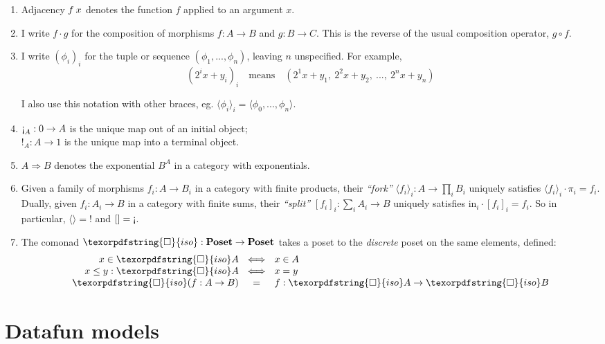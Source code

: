 \documentclass{rntz}\usepackage[a5]{rntzgeometry}\usepackage[fullwidth=130mm,width=330pt,]{narrow}
\newcommand\cat\textbf
\newcommand\Poset{\cat{Poset}}
\newcommand\initO{0}
\newcommand\termO{1}
\newcommand\initE{\mathord{\text{\textexclamdown}}}
\newcommand\termI{\mathord{!}}
\newcommand\injc{\text{in}}
\newcommand\<{\mskip 4mu plus 4mu minus 1mu}
\newcommand\iso{{\texorpdfstring{\ensuremath{\square}}{iso}}}
\newcommand\isof{\iso}
\newcommand\fork[1]{\langle{#1}\rangle}
\newcommand\krof[1]{[{#1}]}
\newcommand\homto\Rightarrow
\newcommand\then{\mathbin{;}}
\renewcommand\then\cdot
\begin{document}
\begin{enumerate}
\item Adjacency $f\<x$ denotes the function $f$ applied to an argument $x$.

\item I write $f \then g$ for the composition of morphisms $f : A \to B$ and $g
  : B \to C$. This is the reverse of the usual composition operator, $g \circ
  f$.

  \newcommand\iexpr{\phi}
\item I write $(\iexpr_i)_i$ for the tuple or sequence $(\iexpr_1,
  ..., \iexpr_n)$, leaving $n$ unspecified. For example,
  \[ (2^ix + y_i)_i \quad\text{means}\quad
  (2^1x + y_1,~ 2^2x + y_2,~ ...,~ 2^nx + y_n) \]

  \noindent
  I also use this notation with other braces, eg. $\fork{\iexpr_i}_i =
  \fork{\iexpr_0, ..., \iexpr_n}$.

\item $\initE_A : \initO \to A$ is the unique map out of an initial object;\\
  $\termI_A : A \to \termO$ is the unique map into a terminal object.

\item $A \homto B$ denotes the exponential $B^A$ in a category with
  exponentials.

\item Given a family of morphisms $f_i : A \to B_i$ in a category with finite
  products, their \emph{``fork''} $\fork{f_i}_i : A \to \textstyle\prod_{i} B_i$
  uniquely satisfies $\fork{f_i}_i \then \pi_i = f_i$. Dually, given $f_i : A_i
  \to B$ in a category with finite sums, their \emph{``split''} $\krof{f_i}_i :
  \sum_i A_i \to B$ uniquely satisfies $\injc_i \then \krof{f_i}_i = f_i$. So in
  particular, $\fork{} = \termI$ and $\krof{} = \initE$.

\item The comonad $\iso : \Poset \to \Poset$ takes a poset to the
  \emph{discrete} poset on the same elements, defined:
  \[\setlength\arraycolsep{.33em}
  \begin{array}{rcl}
    x \in \isof A &\iff& x \in A\\
    x \le y : \isof A &\iff& x = y\\
    \isof(f : A \to B) &=& f : \isof A \to \isof B
  \end{array}\]
\end{enumerate}


\section{Datafun models}
\label{sec:datafun-models}
\end{document}

